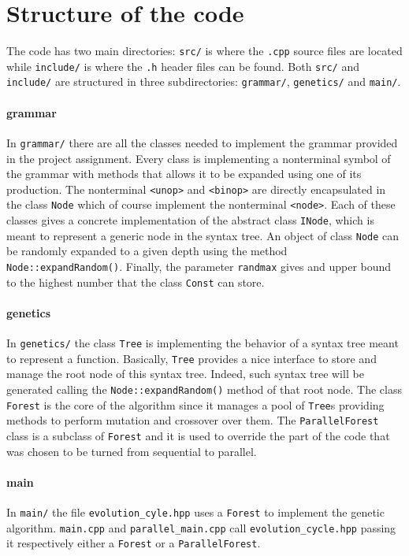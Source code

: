 \documentclass[10pt]{article}
\numberwithin{equation}{section}
\begin{document}
\section{Structure of the code} \label{codestructure}
The code has two main directories: \verb|src/| is where the \verb|.cpp| source files are located while \verb|include/| is where the \verb|.h| header files can be found. Both \verb|src/| and \verb|include/| are structured in three subdirectories: \verb|grammar/|, \verb|genetics/| and \verb|main/|.

\paragraph{grammar}
In \verb|grammar/| there are all the classes needed to implement the grammar provided in the project assignment. Every class is implementing a nonterminal symbol of the grammar with methods that allows it to be expanded using one of its production. The nonterminal \verb|<unop>| and \verb|<binop>| are directly encapsulated in the class \verb|Node| which of course implement the nonterminal \verb|<node>|. Each of these classes gives a concrete implementation of the abstract class \verb|INode|, which is meant to represent a generic node in the syntax tree. An object of class \verb|Node| can be randomly expanded to a given depth using the method \verb|Node::expandRandom()|. Finally, the parameter \verb|randmax| gives and upper bound to the highest number that the class \verb|Const| can store.

\paragraph{genetics}
In \verb|genetics/| the class \verb|Tree| is implementing the behavior of a syntax tree meant to represent a function. Basically, \verb|Tree| provides a nice interface to store and manage the root node of this syntax tree. Indeed, such syntax tree will be generated calling the \verb|Node::expandRandom()| method of that root node. The class \verb|Forest| is the core of the algorithm since it manages a pool of \verb|Tree|s providing methods to perform mutation and crossover over them. The \verb|ParallelForest| class is a subclass of \verb|Forest| and it is used to override the part of the code that was chosen to be turned from sequential to parallel.

\paragraph{main}
In \verb|main/| the file \verb|evolution_cyle.hpp| uses a \verb|Forest| to implement the genetic algorithm. \verb|main.cpp| and \verb|parallel_main.cpp| call \verb|evolution_cycle.hpp| passing it respectively either a \verb|Forest| or a \verb|ParallelForest|.
\end{document}

